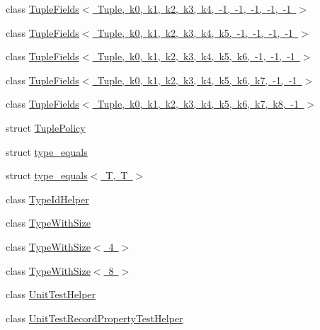 \begin{DoxyCompactItemize}
\item 
class \mbox{\hyperlink{classtesting_1_1internal_1_1_tuple_fields_3_01_tuple_00_01k0_00_01k1_00_01k2_00_01k3_00_01k4_00_24d73e0cd5fb480b4f69b3d189a737e1}{Tuple\+Fields$<$ Tuple, k0, k1, k2, k3, k4, -\/1, -\/1, -\/1, -\/1, -\/1 $>$}}
\item 
class \mbox{\hyperlink{classtesting_1_1internal_1_1_tuple_fields_3_01_tuple_00_01k0_00_01k1_00_01k2_00_01k3_00_01k4_00_fc3c297a037e5312ea5ea32562e3997e}{Tuple\+Fields$<$ Tuple, k0, k1, k2, k3, k4, k5, -\/1, -\/1, -\/1, -\/1 $>$}}
\item 
class \mbox{\hyperlink{classtesting_1_1internal_1_1_tuple_fields_3_01_tuple_00_01k0_00_01k1_00_01k2_00_01k3_00_01k4_00_15a5f7560bc4eac1ca3e5cac752bf68d}{Tuple\+Fields$<$ Tuple, k0, k1, k2, k3, k4, k5, k6, -\/1, -\/1, -\/1 $>$}}
\item 
class \mbox{\hyperlink{classtesting_1_1internal_1_1_tuple_fields_3_01_tuple_00_01k0_00_01k1_00_01k2_00_01k3_00_01k4_00_cda35487ca7d3bd5a9557919642ae14b}{Tuple\+Fields$<$ Tuple, k0, k1, k2, k3, k4, k5, k6, k7, -\/1, -\/1 $>$}}
\item 
class \mbox{\hyperlink{classtesting_1_1internal_1_1_tuple_fields_3_01_tuple_00_01k0_00_01k1_00_01k2_00_01k3_00_01k4_00_9c7cea784cec512ef84e111fc1d12260}{Tuple\+Fields$<$ Tuple, k0, k1, k2, k3, k4, k5, k6, k7, k8, -\/1 $>$}}
\item 
struct \mbox{\hyperlink{structtesting_1_1internal_1_1_tuple_policy}{Tuple\+Policy}}
\item 
struct \mbox{\hyperlink{structtesting_1_1internal_1_1type__equals}{type\+\_\+equals}}
\item 
struct \mbox{\hyperlink{structtesting_1_1internal_1_1type__equals_3_01_t_00_01_t_01_4}{type\+\_\+equals$<$ T, T $>$}}
\item 
class \mbox{\hyperlink{classtesting_1_1internal_1_1_type_id_helper}{Type\+Id\+Helper}}
\item 
class \mbox{\hyperlink{classtesting_1_1internal_1_1_type_with_size}{Type\+With\+Size}}
\item 
class \mbox{\hyperlink{classtesting_1_1internal_1_1_type_with_size_3_014_01_4}{Type\+With\+Size$<$ 4 $>$}}
\item 
class \mbox{\hyperlink{classtesting_1_1internal_1_1_type_with_size_3_018_01_4}{Type\+With\+Size$<$ 8 $>$}}
\item 
class \mbox{\hyperlink{classtesting_1_1internal_1_1_unit_test_helper}{Unit\+Test\+Helper}}
\item 
class \mbox{\hyperlink{classtesting_1_1internal_1_1_unit_test_record_property_test_helper}{Unit\+Test\+Record\+Property\+Test\+Helper}}

\end{DoxyCompactItemize}
